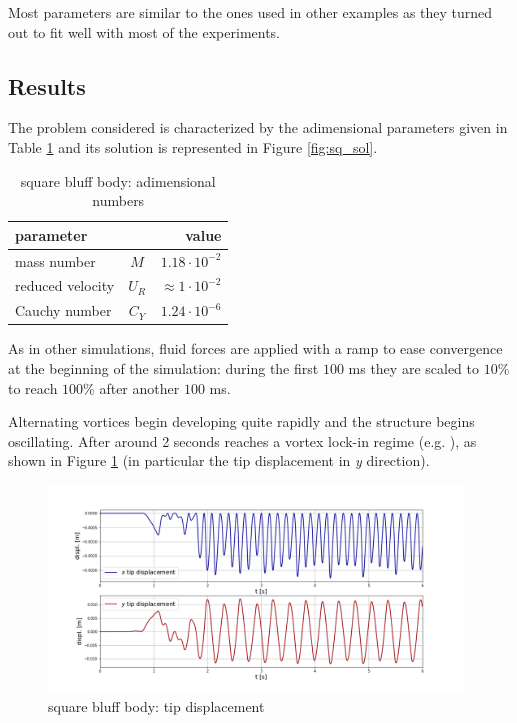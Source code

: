 Most parameters are similar to the ones used in other examples as they turned out to fit well with most of the experiments. 

\subsection{Results}

The problem considered is characterized by the adimensional parameters given in Table \ref{table:sq-adim} and its solution is represented in Figure \ref{fig:sq_sol}.

\begin{table}[!htb]
	\begin{center}
		\begin{tabular}{ l c | r } 
			parameter & & value   \\ 
			\hline
			mass number  & $M$ & $ 1.18\cdot 10^{-2}$     \\
			reduced velocity & $U_R$ & $ \approx 1\cdot 10^{-2}$  \\
			Cauchy number  & $C_Y$ & $  1.24 \cdot 10^{-6}$  \\			
		\end{tabular}
	\end{center}
	\caption{square bluff body: adimensional numbers}
	\label{table:sq-adim}
\end{table}

As in other simulations, fluid forces are applied with a ramp to ease convergence at the beginning of the simulation: during the first $100$ \si{ms} they are scaled to $10\%$ to reach $100\%$ after another $100$ \si{ms}.

Alternating vortices begin developing quite rapidly and the structure begins oscillating. After around 2 seconds reaches a vortex lock-in regime (e.g. \cite{hong2001fluid}), as shown in Figure \ref{fig:sq_displacement} (in particular the tip displacement in \textit{y} direction).



\begin{figure}[htbp!]
	\centering
	\includegraphics[width=0.98\textwidth, trim=20 20 20 50, clip]{images/sq-cyl/disp_sq.png}
	\caption{square bluff body: tip displacement}
	\label{fig:sq_displacement}
\end{figure}

